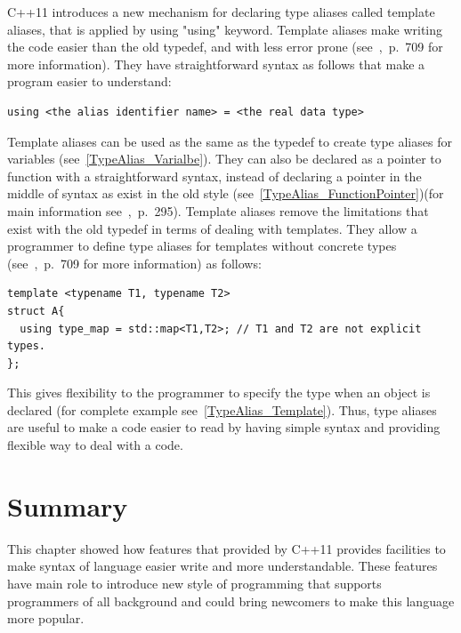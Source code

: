 \documentclass[11pt]{report}
\begin{document}
C++11 introduces a new mechanism for declaring type aliases called template aliases, that is applied by using "using" keyword. Template aliases make writing the code easier than the old typedef, and with less error prone \linebreak (see~\cite{Gregorie:professionalcpp},~p.~709 for more information). They have straightforward syntax as follows that make a program easier to understand:
\begin{lstlisting}
using <the alias identifier name> = <the real data type>
\end{lstlisting}
Template aliases can be used as the same as the typedef to create type aliases for variables (see~\ref{TypeAlias_Varialbe}). They can also be declared as a pointer to function with a straightforward syntax, instead of declaring a pointer in the middle of syntax as exist in the old style (see~\ref{TypeAlias_FunctionPointer})(for main information see~\cite{Gregorie:professionalcpp},~p.~295). Template aliases remove the limitations that exist with the old typedef in terms of dealing with templates. They allow a programmer to define type aliases for templates without concrete types (see~\cite{Gregorie:professionalcpp},~p.~709 for more information) as follows:
\begin{lstlisting}
template <typename T1, typename T2>
struct A{
  using type_map = std::map<T1,T2>; // T1 and T2 are not explicit types.
};
\end{lstlisting}
This gives flexibility to the programmer to specify the type when an object is declared (for complete example see~\ref{TypeAlias_Template}). Thus, type aliases are useful to make a code easier to read by having simple syntax and providing flexible way to deal with a code.

\section{Summary}
\label{sect: Summary}
This chapter showed how features that provided by C++11 provides facilities to make syntax of language easier write and more understandable. These features have main role to introduce new style of programming that supports programmers of all background and could bring newcomers to make this language more popular.

\end{document}
